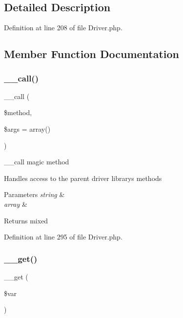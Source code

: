 \subsection{Detailed Description}


Definition at line 208 of file Driver.\+php.



\subsection{Member Function Documentation}
\mbox{\label{class_c_i___driver_a57936fde7f1adea3f3e7dfca474a1786}} 
\subsubsection{\texorpdfstring{\_\_call()}{\_\_call()}}
{\footnotesize\ttfamily \+\_\+\+\_\+call (\begin{DoxyParamCaption}\item[{}]{\$method,  }\item[{}]{\$args = {\ttfamily array()} }\end{DoxyParamCaption})}

\+\_\+\+\_\+call magic method

Handles access to the parent driver library\textquotesingle{}s methods


\begin{DoxyParams}{Parameters}
{\em string} & \\
\hline
{\em array} & \\
\hline
\end{DoxyParams}
\begin{DoxyReturn}{Returns}
mixed 
\end{DoxyReturn}


Definition at line 295 of file Driver.\+php.

\mbox{\label{class_c_i___driver_a8fb2d9cdca17b87400e780b9f9720933}} 
\subsubsection{\texorpdfstring{\_\_get()}{\_\_get()}}
{\footnotesize\ttfamily \+\_\+\+\_\+get (\begin{DoxyParamCaption}\item[{}]{\$var }\end{DoxyParamCaption})}

